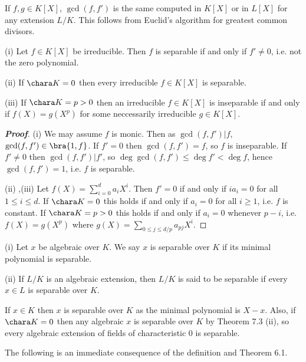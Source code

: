 \begin{remark}
If $f, g \in K[X]$, $\gcd(f, f')$ is the same computed in $K[X]$ or in $L[X]$ for any extension $L/K$. This follows from Euclid's algorithm for greatest common divisors.
\end{remark}


\begin{theorem}
\ben
\item [(i)] Let $f \in K[X]$ be irreducible. Then $f$ is separable if and only if $f' \neq 0$, i.e. not the zero polynomial.
\item [(ii)] If $\chara K = 0$ then every irreducible $f \in K[X]$ is separable.
\item [(iii)] If $\chara K = p > 0$ then an irreducible $f \in K[X]$ is inseparable if and only if $f(X) = g(X^p)$ for some neccessarily irreducible $g \in K[X]$.
\een
\end{theorem}

\begin{proof}[\bf Proof]
\ben
\item [(i)] We may assume $f$ is monic. Then as $\gcd(f, f') | f$, $\gcd(f, f') \in \bra{1, f}$. If $f' = 0$ then $\gcd(f, f') = f$, so $f$ is inseparable. If $f' \neq 0$ then $\gcd(f, f') | f'$, so $\deg \gcd(f, f') \leq \deg f' < \deg f$, hence $\gcd(f, f') = 1$, i.e. $f$ is separable.
\item [(ii)],(iii) Let $f(X) = \sum^d_{i=0} a_iX^i$. Then $f' = 0$ if and only if $ia_i = 0$ for all $1 \leq  i \leq  d$. If $\chara K = 0$ this holds if and only if $a_i = 0$ for all $i \geq 1$, i.e. $f$ is constant. If $\chara K = p > 0$ this holds if and only if $a_i = 0$ whenever $p - i$, i.e. $f(X) = g(X^p)$ where $g(X) = \sum_{0\leq j\leq d/p} a_{pj}X^i$.
\een
\end{proof}

\begin{definition}
\ben
\item [(i)] Let $x$ be algebraic over $K$. We say $x$ is separable over $K$ if its minimal polynomial is separable.
\item [(ii)] If $L/K$ is an algebraic extension, then $L/K$ is said to be separable if every $x \in L$ is separable over $K$.
\een
\end{definition}

\begin{remark}
If $x \in K$ then $x$ is separable over $K$ as the minimal polynomial is $X - x$. Also, if $\chara K = 0$ then any algebraic $x$ is separable over $K$ by Theorem 7.3 (ii), so every algebraic extension of fields of characteristic 0 is separable.

The following is an immediate consequence of the definition and Theorem 6.1.
\end{remark}

